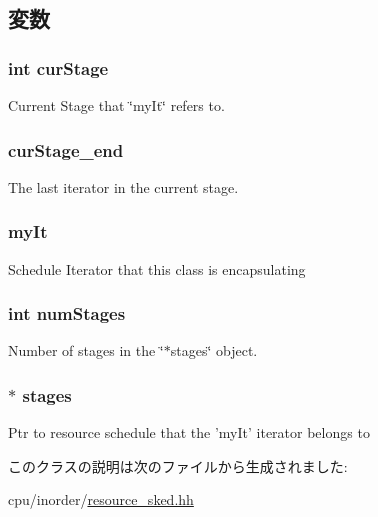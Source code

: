 \subsection{変数}
\hypertarget{classRSkedIt_a29dad7ce07901930a4b9f505dbc4b96c}{
\subsubsection[{curStage}]{\setlength{\rightskip}{0pt plus 5cm}int {\bf curStage}}}
\label{classRSkedIt_a29dad7ce07901930a4b9f505dbc4b96c}
Current Stage that \char`\"{}myIt\char`\"{} refers to. \hypertarget{classRSkedIt_a603d9e7d20786833c977a34f54167ffe}{
\subsubsection[{curStage\_\-end}]{ {\bf curStage\_\-end}}}
\label{classRSkedIt_a603d9e7d20786833c977a34f54167ffe}
The last iterator in the current stage. \hypertarget{classRSkedIt_a70c82c6eb922e0385c2541c5858f91f4}{
\subsubsection[{myIt}]{ {\bf myIt}}}
\label{classRSkedIt_a70c82c6eb922e0385c2541c5858f91f4}
Schedule Iterator that this class is encapsulating \hypertarget{classRSkedIt_aaf4f71ec3fd6f4e154d09cd71c2c331b}{
\subsubsection[{numStages}]{\setlength{\rightskip}{0pt plus 5cm}int {\bf numStages}}}
\label{classRSkedIt_aaf4f71ec3fd6f4e154d09cd71c2c331b}
Number of stages in the \char`\"{}$\ast$stages\char`\"{} object. \hypertarget{classRSkedIt_a8d03655351f40ef469aa02c41eddd6e8}{
\subsubsection[{stages}]{$\ast$ {\bf stages}}}
\label{classRSkedIt_a8d03655351f40ef469aa02c41eddd6e8}
Ptr to resource schedule that the 'myIt' iterator belongs to 

このクラスの説明は次のファイルから生成されました:\begin{DoxyCompactItemize}
\item 
cpu/inorder/\hyperlink{resource__sked_8hh}{resource\_\-sked.hh}\end{DoxyCompactItemize}

